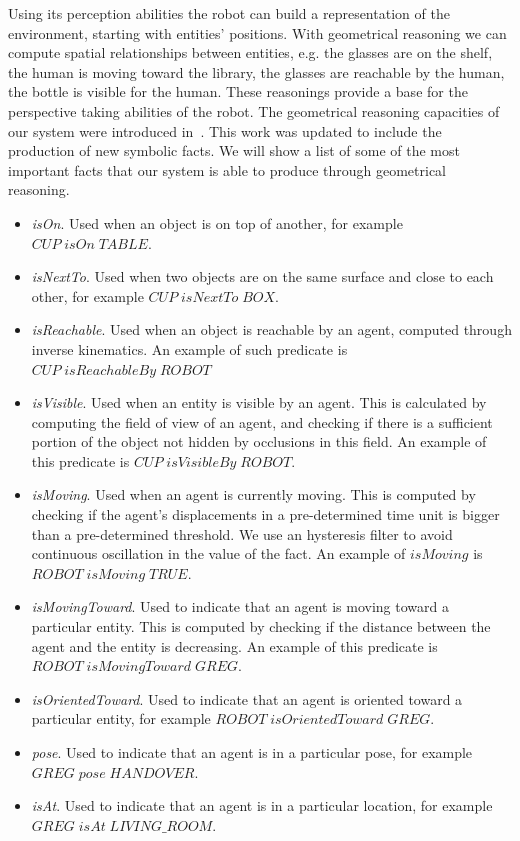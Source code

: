Using its perception abilities the robot can build a representation of the environment, starting with entities' positions. With geometrical reasoning we can compute spatial relationships between entities, e.g. the glasses are on the shelf, the human is moving toward the library, the glasses are reachable by the human, the bottle is visible for the human. These reasonings provide a base for the perspective taking abilities of the robot.  The geometrical reasoning capacities of our system were introduced in~\cite{Sisbot2011}. This work was updated to include the production of new symbolic facts. We will show a list of some of the most important facts that our system is able to produce through geometrical reasoning.

\begin{itemize}
\item \textit{isOn}. Used when an object is on top of another, for example $CUP\; isOn\; TABLE$.
\item \textit{isNextTo}. Used when two objects are on the same surface and close to each other, for example $CUP\; isNextTo\; BOX$.
\item \textit{isReachable}. Used when an object is reachable by an agent, computed through inverse kinematics. An example of such predicate is $CUP\; isReachableBy\; ROBOT$
\item \textit{isVisible}. Used when an entity is visible by an agent. This is calculated by computing the field of view of an agent, and checking if there is a sufficient portion of the object not hidden by occlusions in this field. An example of this predicate is $CUP\; isVisibleBy\; ROBOT$.
\item \textit{isMoving}. Used when an agent is currently moving. This is computed by checking if the agent's displacements in a pre-determined time unit is bigger than a pre-determined threshold. We use an hysteresis filter to avoid continuous oscillation in the value of the fact. An example of $isMoving$ is $ROBOT\; isMoving\; TRUE$.
\item \textit{isMovingToward}. Used to indicate that an agent is moving toward a particular entity. This is computed by checking if the distance between the agent and the entity is decreasing. An example of this predicate is $ROBOT\; isMovingToward\; GREG$.
\item \textit{isOrientedToward}. Used to indicate that an agent is oriented toward a particular entity, for example $ROBOT\; isOrientedToward\; GREG$.
\item \textit{pose}. Used to indicate that an agent is in a particular pose, for example $GREG\; pose\; HANDOVER$.
\item \textit{isAt}. Used to indicate that an agent is in a particular location, for example $GREG\; isAt\; LIVING\_ROOM$.
\end{itemize}


